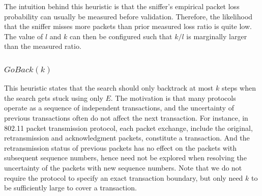 The intuition behind this heuristic is that the sniffer's empirical packet loss
probability can usually be measured before validation. Therefore, the likelihood
that the sniffer misses more packets than prior measured loss ratio is quite
low. The value of $l$ and $k$ can then be configured such that $k/l$ is marginally
larger than the measured ratio.

\subsubsection{$\mathit{GoBack}(k)$}

This heuristic states that the search should only
backtrack at most $k$ steps when the search gets stuck using only $E$.
The motivation is that many protocols operate as a sequence of independent
transactions, and the uncertainty of previous transactions often do not affect
the next transaction.
For instance, in 802.11 packet transmission protocol, each packet exchange,
include the original, retransmission and acknowledgment packets, constitute a
transaction.
And the retransmission status of previous packets has no effect on the packets
with subsequent sequence numbers, hence need not be explored when resolving the
uncertainty of the packets with new sequence numbers.  Note that we do not
require the protocol to specify an exact transaction boundary, but only need $k$
to be sufficiently large to cover a transaction. 

